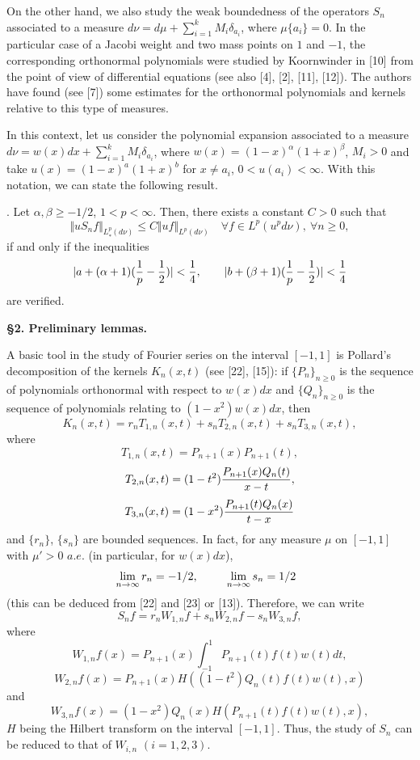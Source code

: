 On the other hand, we also study the weak boundedness of the operators $S_n$
associated to a measure $d\nu = d\mu + \sum_{i=1}^k M_i \delta_{a_i}$,
where $\mu\{a_i\} = 0$. In the particular case of a Jacobi weight and two mass
points on $1$ and $-1$, the corresponding orthonormal polynomials were studied
by Koornwinder in [10] from the point of view of differential equations (see
also [4], [2], [11], [12]). The authors have found (see [7]) some estimates for
the orthonormal polynomials and kernels relative to this type of measures.

In this context, let us consider the polynomial expansion associated to a
measure $d\nu = w(x)dx + \sum_{i=1}^k M_i \delta_{a_i}$, where
$w(x)=(1-x)^\alpha(1+x)^\beta$, $M_i>0$ and take $u(x)=(1-x)^a(1+x)^b$ for $x
\not= a_i$, $0<u(a_i)<\infty$. With this notation, we can state the following
result.

\medskip

. Let $\alpha, \beta \geq -1/2$, $1<p<\infty$. Then, there
exists a constant $C>0$ such that
$$
   \Vert uS_nf \Vert _{L^p_*(d\nu)} \leq C \Vert uf \Vert _{L^p(d\nu)}
   \quad \forall f \in L^p(u^pd\nu), \ \forall n \geq 0,
$$
if and only if the inequalities
$$
   \vert a+(\alpha+1)({1 \over p}-{1 \over 2}) \vert < {1 \over 4}, \qquad
   \vert b+(\beta+1)({1 \over p}-{1 \over 2}) \vert < {1 \over 4}
$$
are verified.

\bigskip

{\noindent \bf \S 2. Preliminary lemmas.}

\medskip

\noindent A basic tool in the study of Fourier series on the interval $[-1,1]$
is Pollard's decomposition of the kernels $K_n(x,t)$ (see [22], [15]): if
$\{P_n\}_{n\geq 0}$ is the sequence of polynomials orthonormal with respect to
$w(x)dx$ and $\{Q_n\}_{n\geq 0}$ is the sequence of polynomials relating to
\hbox{$(1-x^2)w(x)dx$}, then
$$
   K_n(x,t) = r_nT_{1,n}(x,t) + s_nT_{2,n}(x,t) + s_nT_{3,n}(x,t),
$$
where
$$
   T_{1,n}(x,t) = P_{n+1}(x) P_{n+1}(t),
$$
$$
   T_{2,n}(x,t) = (1-t^2) {P_{n+1}(x) Q_n(t) \over x-t},
$$
$$
   T_{3,n}(x,t) = (1-x^2) {P_{n+1}(t) Q_n(x) \over t-x}
$$
and $\{r_n\}$, $\{s_n\}$ are bounded sequences. In fact, for any measure $\mu$
on $[-1,1]$ with $\mu'>0$ $a.e.$ (in particular, for $w(x)dx$),
$$
   \vbox{\halign{\hfil #  &  \qquad \hfil # \hfil \cr
   $\displaystyle\lim_{n\to\infty} r_n = -1/2$,
   & $\displaystyle\lim_{n\to\infty} s_n = 1/2$ \cr
   }}
$$
(this can be deduced from [22] and [23] or [13]). Therefore, we can write
$$
   S_nf = r_n W_{1,n}f + s_n W_{2,n}f - s_n W_{3,n}f,
$$
where
$$
   W_{1,n}f(x) = P_{n+1}(x) \int_{-1}^1 P_{n+1}(t) f(t) w(t) dt,
$$
$$
   W_{2,n}f(x) = P_{n+1}(x) H((1-t^2) Q_n(t) f(t) w(t), x)
$$
and
$$
   W_{3,n}f(x) = (1-x^2) Q_n(x) H(P_{n+1}(t) f(t) w(t), x),
$$
$H$ being the Hilbert transform on the interval $[-1,1]$. Thus, the study of
$S_n$ can be reduced to that of $W_{i,n}$ $(i=1,2,3)$.

